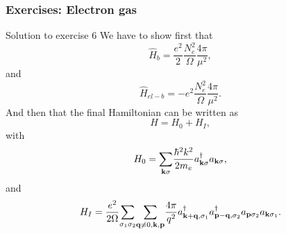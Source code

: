 \documentclass{beamer}
\begin{document}
\begin{frame}
\frametitle{Exercises: Electron gas}

\begin{block}{Solution to exercise 6 }
We have to show first  that
\[
\hat{H}_{b}=\frac{e^2}{2}\frac{N_e^2}{\Omega}\frac{4\pi}{\mu^2},
\]
and
\[
\hat{H}_{el-b}=-e^2\frac{N_e^2}{\Omega}\frac{4\pi}{\mu^2}.
\]
And then that the final Hamiltonian can be written as 
\[
H=H_{0}+H_{I},
\]
with
\[
H_{0}={\displaystyle\sum_{{\bf k}\sigma}}
\frac{\hbar^{2}k^{2}}{2m_e}a_{{\bf k}\sigma}^{\dagger}
a_{{\bf k}\sigma},
\]
and
\[
H_{I}=\frac{e^{2}}{2\Omega}{\displaystyle\sum_{\sigma_{1}
\sigma_{2}}}{\displaystyle
\sum_{{\bf q}\neq 0,{\bf k},{\bf p}}}\frac{4\pi}{q^{2}}
a_{{\bf k}+{\bf q},\sigma_{1}}^{\dagger}
a_{{\bf p}-{\bf q},\sigma_{2}}^{\dagger}
a_{{\bf p}\sigma_{2}}a_{{\bf k}\sigma_{1}}.
\] 

\end{block}
\end{frame}
\end{document}
